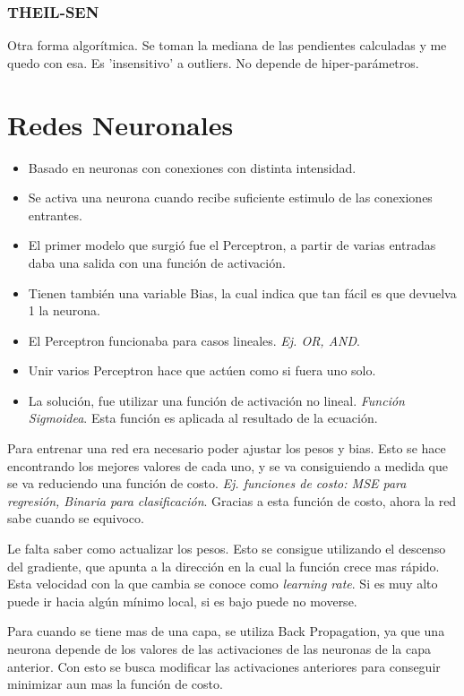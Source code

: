 \documentclass[titlepage,a4paper]{article}
\begin{document}
\subsubsection{THEIL-SEN}
Otra forma algorítmica. Se toman la mediana de las pendientes calculadas y me quedo con esa. Es 'insensitivo' a outliers. No depende de hiper-parámetros.


\newpage

\section{Redes Neuronales}
\begin{itemize}
    \item Basado en neuronas con conexiones con distinta intensidad.
    \item Se activa una neurona cuando recibe suficiente estimulo de las conexiones entrantes.
    \item El primer modelo que surgió fue el Perceptron, a partir de varias entradas daba una salida con una función de activación.
    \item Tienen también una variable Bias, la cual indica que tan fácil es que devuelva 1 la neurona.
    \item El Perceptron funcionaba para casos lineales. \textit{Ej. OR, AND}. 
    \item Unir varios Perceptron hace que actúen como si fuera uno solo.
    \item La solución, fue utilizar una función de activación no lineal. \textit{Función Sigmoidea}. Esta función es aplicada al resultado de la ecuación.
\end{itemize}

Para entrenar una red era necesario poder ajustar los pesos y bias. Esto se hace encontrando los mejores valores de cada uno, y se va consiguiendo a medida que se va reduciendo una función de costo. \textit{Ej. funciones de costo: MSE para regresión, Binaria para clasificación}. Gracias a esta función de costo, ahora la red sabe cuando se equivoco. 

Le falta saber como actualizar los pesos. Esto se consigue utilizando el descenso del gradiente, que apunta a la dirección en la cual la función crece mas rápido. Esta velocidad con la que cambia se conoce como \textit{learning rate}. Si es muy alto puede ir hacia algún mínimo local, si es bajo puede no moverse.

Para cuando se tiene mas de una capa, se utiliza Back Propagation, ya que una neurona depende de los valores de las activaciones de las neuronas de la capa anterior. Con esto se busca modificar las activaciones anteriores para conseguir minimizar aun mas la función de costo.
\end{document}
